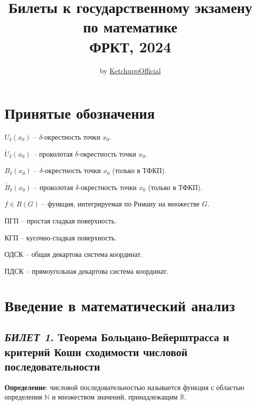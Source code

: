 \documentclass[12pt, a4paper, reqno]{article}
\title{\bf Билеты к государственному экзамену по математике \\ ФРКТ, 2024}
\date{}
\author{by \href{https://github.com/KetchuppOfficial}{KetchuppOfficial}}
\begin{document}
\nocite{petrovich-1}

\maketitle

\newpage
\tableofcontents

\newpage
\section{Принятые обозначения}

    $U_{\delta}(x_0)$ -- $\delta$-окрестность точки $x_0$.

    $\mathring U_{\delta}(x_0)$ -- проколотая $\delta$-окрестность точки $x_0$.

    $B_{\delta}(x_0)$ -- $\delta$-окрестность точки $x_0$ (только в ТФКП).

    $\mathring B_{\delta}(x_0)$ -- проколотая $\delta$-окрестность точки $x_0$ (только в ТФКП).

    $f \in R(G)$ -- функция, интегрируемая по Риману на множестве $G$.

    ПГП -- простая гладкая поверхность.

    КГП -- кусочно-гладкая поверхность.

    ОДСК -- общая декартова система координат.

    ПДСК -- прямоугольная декартова система координат.

\newpage
\section{Введение в математический анализ}

\subsection{\textit{БИЛЕТ 1}. Теорема Больцано-Вейерштрасса и критерий Коши сходимости числовой последовательности}

    \textbf{Определение}: числовой последовательностью называется функция с областью определения
    $\mathbb{N}$ и множеством значений, принадлежащим $\mathbb{R}$.
\end{document}
